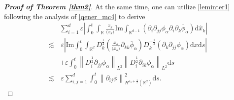 \documentclass[10pt,twoside,a4paper]{article}
\numberwithin{equation}{section}\allowdisplaybreaks
\begin{document}
\begin{proof}[\textbf{Proof of Theorem \ref{thm2}}]
At the same time,  one can  utilize \eqref{leminter1} following the analysis of  \eqref{qener_mc4} to derive 
\begin{align}    \label{aqm1}
	&\sum_{i=1}^d\varepsilon\left|\int_0^t\int_{\mathbb{R}}     \frac{x_k}{\langle x_k\rangle}    \mathrm{Im}\int_{\mathbb{R}^{d-1}} \left(\partial_{i}\partial_{jj} \phi_\alpha\partial_i\partial_k \overline{\phi}_\alpha\right) \mathrm{d} \hat{x}_k\right|\\
	\lesssim&\, \varepsilon\left|\mathrm{Im}\int_0^t\int_{\mathbb{R}^d}   D_k^{\frac 12}\left( \frac{x_k}{\langle x_k\rangle}    \partial_{kk} \overline{\phi}_\alpha \right)D_k^{-\frac 12}\left(\partial_k \partial_{jj}\phi_{\alpha } \right) \mathrm{d} x\mathrm{d}s\right|\nonumber\\
	&+\varepsilon\int_0^t\left\|   D_i^{\frac 12} \partial_{jj}\phi_{\alpha}\right\|_{L^2} \left\|   D_i^{\frac 12} \partial_{ik}\phi_{\alpha}\right\|_{L^2} \mathrm{d} s\nonumber\\
	\lesssim &\,\varepsilon  \sum_{i,j=1}^d\int_0^t\left\| \partial_{ij}\phi\right\|_{H^{s_1+\frac 12}(\mathbb{R}^d)}^2 \mathrm{d} s.\nonumber

\end{align}
\end{proof}
\end{document}
